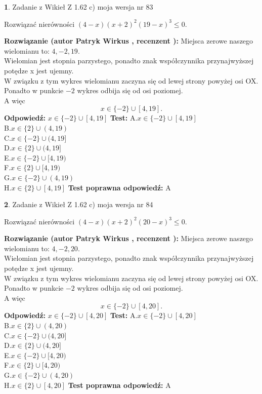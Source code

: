\documentclass[12pt, a4paper]{article}
\theoremstyle{definition} %
\newtheorem{zad}{}
\newcommand{\zadStart}[1]{\begin{zad}#1\newline}
\newcommand{\zadStop}{\end{zad}}
\newcommand{\rozwStart}[2]{\noindent \textbf{Rozwiązanie (autor #1 , recenzent #2): }\newline}
\newcommand{\rozwStop}{\newline}
\newcommand{\odpStart}{\noindent \textbf{Odpowiedź:}\newline}
\newcommand{\odpStop}{\newline}
\newcommand{\testStart}{\noindent \textbf{Test:}\newline}
\newcommand{\testStop}{\newline}
\newcommand{\kluczStart}{\noindent \textbf{Test poprawna odpowiedź:}\newline}
\newcommand{\kluczStop}{\newline}
\begin{document}
\zadStart{Zadanie z Wikieł Z 1.62 c) moja wersja nr 83}

Rozwiązać nierówności $(4-x)(x+2)^{2}(19-x)^{3}\le0$.
\zadStop
\rozwStart{Patryk Wirkus}{}
Miejsca zerowe naszego wielomianu to: $4, -2, 19$.\\
Wielomian jest stopnia parzystego, ponadto znak współczynnika przy\linebreak najwyższej potędze x jest ujemny.\\ W związku z tym wykres wielomianu zaczyna się od lewej strony powyżej osi OX.\\
Ponadto w punkcie $-2$ wykres odbija się od osi poziomej.\\
A więc $$x \in \{-2\} \cup [4,19].$$
\rozwStop
\odpStart
$x \in \{-2\} \cup [4,19]$
\odpStop
\testStart
A.$x \in \{-2\} \cup [4,19]$\\
B.$x \in \{2\} \cup (4,19)$\\
C.$x \in \{-2\} \cup (4,19]$\\
D.$x \in \{2\} \cup (4,19]$\\
E.$x \in \{-2\} \cup [4,19)$\\
F.$x \in \{2\} \cup [4,19)$\\
G.$x \in \{-2\} \cup (4,19)$\\
H.$x \in \{2\} \cup [4,19]$
\testStop
\kluczStart
A
\kluczStop



\zadStart{Zadanie z Wikieł Z 1.62 c) moja wersja nr 84}

Rozwiązać nierówności $(4-x)(x+2)^{2}(20-x)^{3}\le0$.
\zadStop
\rozwStart{Patryk Wirkus}{}
Miejsca zerowe naszego wielomianu to: $4, -2, 20$.\\
Wielomian jest stopnia parzystego, ponadto znak współczynnika przy\linebreak najwyższej potędze x jest ujemny.\\ W związku z tym wykres wielomianu zaczyna się od lewej strony powyżej osi OX.\\
Ponadto w punkcie $-2$ wykres odbija się od osi poziomej.\\
A więc $$x \in \{-2\} \cup [4,20].$$
\rozwStop
\odpStart
$x \in \{-2\} \cup [4,20]$
\odpStop
\testStart
A.$x \in \{-2\} \cup [4,20]$\\
B.$x \in \{2\} \cup (4,20)$\\
C.$x \in \{-2\} \cup (4,20]$\\
D.$x \in \{2\} \cup (4,20]$\\
E.$x \in \{-2\} \cup [4,20)$\\
F.$x \in \{2\} \cup [4,20)$\\
G.$x \in \{-2\} \cup (4,20)$\\
H.$x \in \{2\} \cup [4,20]$
\testStop
\kluczStart
A
\kluczStop
\end{document}
